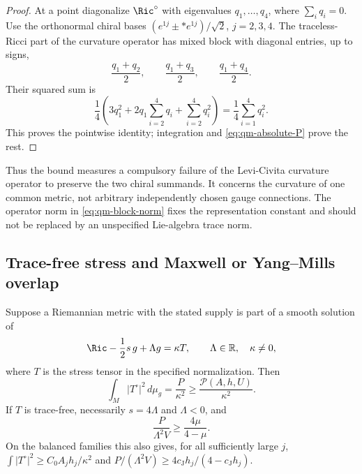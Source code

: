 \begin{proof}
At a point diagonalize $\Ric^\circ$ with eigenvalues $q_1,\ldots,q_4$,
where $\sum_iq_i=0$.  Use the orthonormal chiral bases
$(e^{1j}\pm *e^{1j})/\sqrt2$, $j=2,3,4$.  The traceless-Ricci part
of the curvature operator has mixed block with diagonal entries,
up to signs,
\[
 \frac{q_1+q_2}{2},\qquad
 \frac{q_1+q_3}{2},\qquad
 \frac{q_1+q_4}{2}.
\]
Their squared sum is
\[
 \frac14\left(3q_1^2+2q_1\sum_{i=2}^4q_i+
                          \sum_{i=2}^4q_i^2\right)
 =\frac14\sum_{i=1}^4q_i^2.
\]
This proves the pointwise identity; integration and
\eqref{eq:qm-absolute-P} prove the rest.
\end{proof}

Thus the bound measures a compulsory failure of the Levi-Civita curvature
operator to preserve the two chiral summands.  It concerns the curvature
of one common metric, not arbitrary independently chosen gauge
connections.  The operator norm in \eqref{eq:qm-block-norm} fixes the
representation constant and should not be replaced by an unspecified
Lie-algebra trace norm.

\subsection{Trace-free stress and Maxwell or Yang--Mills overlap}

\begin{proposition}
\label{prop:qm-stress}
Suppose a Riemannian metric with the stated supply is part of a smooth
solution of
\begin{equation}\label{eq:qm-einstein-matter}
 \Ric-\frac12s\,g+\Lambda g=\kappa T,
 \qquad \Lambda\in\mathbb R,\quad \kappa\ne0,
\end{equation}
where $T$ is the stress tensor in the specified normalization.  Then
\begin{equation}\label{eq:qm-stress-bound}
 \int_M|T^\circ|^2\,d\mu_g
 =\frac P{\kappa^2}\ge\frac{\mathscr P(A,h,U)}{\kappa^2}.
\end{equation}
If $T$ is trace-free, necessarily $s=4\Lambda$ and $\Lambda<0$, and
\begin{equation}\label{eq:qm-stress-dimensionless}
 \frac{P}{\Lambda^2V}\ge\frac{4\mu}{4-\mu}.
\end{equation}
On the balanced families this also gives, for all sufficiently large $j$,
$\int|T^\circ|^2\ge C_0A_jh_j/\kappa^2$ and
$P/(\Lambda^2V)\ge4c_{\mathrm J}h_j/(4-c_{\mathrm J}h_j)$.
\end{proposition}

